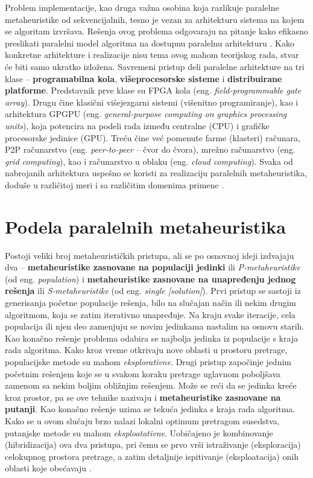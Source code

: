 \documentclass[a4paper]{article}
\begin{document}
Problem implementacije, kao druga važna osobina koja razlikuje paralelne metaheuristike od sekvencijalnih, tesno je vezan za arhitekturu sistema na kojem se algoritam izvršava. Rešenja ovog problema odgovaraju na pitanje kako efikasno preslikati paralelni model algoritma na dostupnu paralelnu arhitekturu \cite{alba2, talbi}. Kako konkretne arhitekture i realizacije nisu tema ovog mahom teorijskog rada, stvar će biti samo ukratko izložena. Savremeni pristup deli paralelne arhitekture na tri klase -- \textbf{programabilna kola}, \textbf{višeprocesorske sisteme} i \textbf{distribuirane platforme}. Predstavnik prve klase su FPGA kola (eng. \textit{field-programmable gate array}). Drugu čine klasični višejezgarni sistemi (višenitno programiranje), kao i arhitektura GPGPU (eng. \textit{general-purpose computing on graphics processing units}), koja potencira na podeli rada između centralne (CPU) i grafičke procesorske jedinice (GPU). Treću čine već pomenute farme (klasteri) računara, P2P računarstvo (eng. \textit{peer-to-peer} -- čvor do čvora), mrežno računarstvo (eng. \textit{grid computing}), kao i računarstvo u oblaku (eng. \textit{cloud computing}). Svaka od nabrojanih arhitektura uspešno se koristi za realizaciju paralelnih metaheuristika, doduše u različitoj meri i sa različitim domenima primene \cite{alba, talbi}.

\section{Podela paralelnih metaheuristika}
\label{sec:ParalelneMetaheuristike}

Postoji veliki broj metaheurističkih pristupa, ali se po osnovnoj ideji izdvajaju dva -- \textbf{metaheuristike zasnovane na populaciji jedinki} ili \textit{P-metaheuristike} (od eng. \textit{population}) i \textbf{metaheuristike zasnovane na unapređenju jednog rešenja} ili \textit{S-metaheuristike} (od eng. \textit{single [solution]}). Prvi pristup se sastoji iz generisanja početne populacije rešenja, bilo na slučajan način ili nekim drugim algoritmom, koja se zatim iterativno unapređuje. Na kraju svake iteracije, cela populacija ili njen deo zamenjuju se novim jedinkama nastalim na osnovu starih. Kao konačno rešenje problema odabira se najbolja jedinka iz populacije s kraja rada algoritma. Kako kroz vreme otkrivaju nove oblasti u prostoru pretrage, populacijske metode su mahom \textit{eksplorativne}. Drugi pristup započinje jednim početnim rešenjem koje se u svakom koraku pretrage uglavnom poboljšava zamenom sa nekim boljim obližnjim rešenjem. Može se reći da se jedinka kreće kroz prostor, pa se ove tehnike nazivaju i \textbf{metaheuristike zasnovane na putanji}. Kao konačno rešenje uzima se tekuća jedinka s kraja rada algoritma. Kako se u ovom slučaju brzo nalazi lokalni optimum pretragom susedstva, putanjske metode su mahom \textit{eksploatativne}. Uobičajeno je kombinovanje (hibridizacija) ova dva pristupa, pri čemu se prvo vrši istraživanje (eksploracija) celokupnog prostora pretrage, a zatim detaljnije ispitivanje (eksploatacija) onih oblasti koje obećavaju \cite{alba3}.
\end{document}
